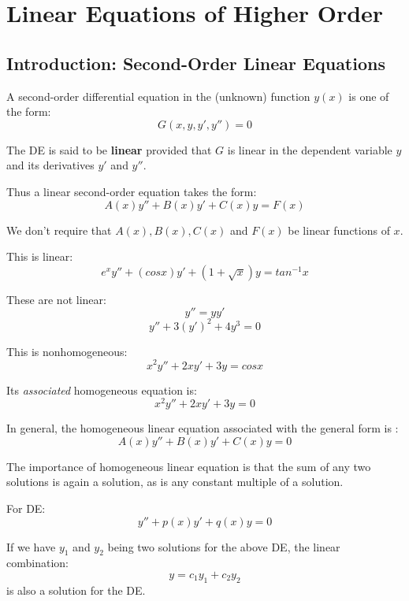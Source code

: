 \chapter{Linear Equations of Higher Order}

\section{Introduction: Second-Order Linear Equations}
\begin{definition}
    A second-order differential equation in the (unknown) function \(y(x)\) is one of the form:
    \[
        G(x, y, y', y'') = 0
    \]     

    The DE is said to be \textbf{linear} provided that \(G\) is linear in the dependent variable \(y\) and its derivatives \(y'\) and \(y''\).   

    Thus a linear second-order equation takes the form:
    \[
        A(x) y'' + B(x) y' + C(x) y = F(x)
    \]

    We don't require that \(A(x), B(x), C(x)\) and \(F(x)\) be linear functions of \(x\).   
\end{definition}

\begin{remark}[Linear]
     This is linear:
     \[
        e^xy'' + (cos x) y' + (1 + \sqrt{x}) y = tan^{-1} x
     \]

    These are not linear:
    \[
        y'' = y y'
    \]
    \[
        y'' + 3(y')^2 + 4y^3 = 0
    \]
\end{remark}

\begin{example}
   This is nonhomogeneous:
   \[
    x^2 y'' + 2xy' + 3y = cos x
   \] 

    Its \textit{associated} homogeneous equation is:
    \[
        x^2 y'' + 2xy' + 3y = 0
    \]

    In general, the homogeneous linear equation associated with the general form is :
    \[
        A(x) y'' + B(x) y' + C(x) y = 0 
    \]
\end{example}

The importance of homogeneous linear equation is that the sum of any two solutions is again a solution, as is any constant multiple of a solution. 

\begin{theorem} 
    For DE:
    \[
        y'' + p(x) y' + q(x) y = 0
    \]

    If we have \(y_1\) and \(y_2\) being two solutions for the above DE,   
    the linear combination:
    \[
        y = c_1y_1 + c_2y_2
    \]
    is also a solution for the DE.
\end{theorem}


